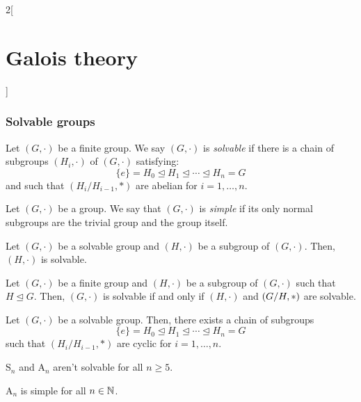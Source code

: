 \documentclass[../../../main.tex]{subfiles}
\begin{document}
\begin{multicols}{2}[\section{Galois theory}]
  \subsubsection{Solvable groups}
  \begin{definition}
    Let $(G,\cdot)$ be a finite group. We say $(G,\cdot)$ is \emph{solvable} if there is a chain of subgroups $(H_i,\cdot)$ of $(G,\cdot)$ satisfying: $$\{e\}=H_0\unlhd H_1\unlhd\cdots\unlhd H_n=G$$ and such that $(H_i/H_{i-1},*)$ are abelian for $i=1,\ldots,n$.
  \end{definition}
  \begin{definition}
    Let $(G,\cdot)$ be a group. We say that $(G,\cdot)$ is \emph{simple} if its only normal subgroups are the trivial group and the group itself.
  \end{definition}
  \begin{prop}
    Let $(G,\cdot)$ be a solvable group and $(H,\cdot)$ be a subgroup of $(G,\cdot)$. Then, $(H,\cdot)$ is solvable.
  \end{prop}
  \begin{prop}
    Let $(G,\cdot)$ be a finite group and $(H,\cdot)$ be a subgroup of $(G,\cdot)$ such that $H\unlhd G$. Then, $(G,\cdot)$ is solvable if and only if $(H,\cdot)$ and $(\quot{G}{H},*)$ are solvable.
  \end{prop}
  \begin{prop}
    Let $(G,\cdot)$ be a solvable group. Then, there exists a chain of subgroups $$\{e\}=H_0\unlhd H_1\unlhd\cdots\unlhd H_n=G$$ such that $(H_i/H_{i-1},*)$ are cyclic for $i=1,\ldots,n$.
  \end{prop}
  \begin{theorem}
    $\text{S}_n$ and $\text{A}_n$ aren't solvable for all $n\geq 5$.
  \end{theorem}
  \begin{theorem}
    $\text{A}_n$ is simple for all $n\in\mathbb{N}$.
  \end{theorem}

\end{multicols}
\end{document}
